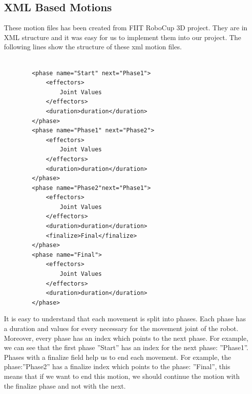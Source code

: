 \subsection{XML Based Motions}
These motion files has been created from FIIT RoboCup 3D project. They are in XML structure and it was easy for us to implement them into our project. The following lines show the structure of these xml motion files.
\begin{verbatim}

		<phase name="Start" next="Phase1">
			<effectors>
				Joint Values
			</effectors>
			<duration>duration</duration>
		</phase>
		<phase name="Phase1" next="Phase2">
			<effectors>
				Joint Values
			</effectors>
			<duration>duration</duration>
		</phase>
		<phase name="Phase2"next="Phase1">
			<effectors>
				Joint Values
			</effectors>
			<duration>duration</duration>
			<finalize>Final</finalize>
		</phase>
		<phase name="Final">
			<effectors>
				Joint Values
			</effectors>
			<duration>duration</duration>
		</phase>

\end{verbatim}
It is easy to understand that each movement is split into phases. Each phase has a duration and values for every necessary for the movement joint of the robot. Moreover, every phase has an index which points to the next phase. For example, we can see that the first phase ''Start'' has an index for the next phase: ''Phase1''. Phases with a finalize field help us to end each movement. For example, the phase:''Phase2'' has a finalize index which points to the phase: ''Final'', this means that if we want to end this motion, we should continue the motion with the finalize phase and not with the next.
